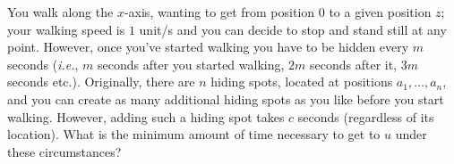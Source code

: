 
You walk along the $x$-axis, wanting to get from position $0$ to a given position $z$;
your walking speed is $1$ unit/s and you can decide to stop and stand still at any point. 
However, once you’ve started walking you have to be hidden every $m$ seconds (\emph{i.e.}, $m$ seconds after you started walking, $2m$ seconds after it, $3m$ seconds etc.). 
Originally, there are $n$ hiding spots, located at positions $a_1 , \ldots , a_n$, and you can create as many additional hiding spots as you like before you start walking.
However, adding such a hiding spot takes $c$ seconds (regardless of its location).
What is the minimum amount of time necessary to get to $u$ under these circumstances?
